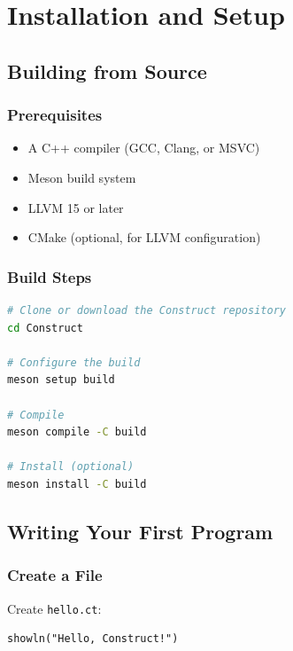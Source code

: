 \documentclass[11pt,twoside,openright]{book}
\begin{document}
\appendix

\chapter{Installation and Setup}

\section{Building from Source}

\subsection{Prerequisites}

\begin{itemize}
    \item A C++ compiler (GCC, Clang, or MSVC)
    \item Meson build system
    \item LLVM 15 or later
    \item CMake (optional, for LLVM configuration)
\end{itemize}

\subsection{Build Steps}

\begin{lstlisting}[language=bash]
# Clone or download the Construct repository
cd Construct

# Configure the build
meson setup build

# Compile
meson compile -C build

# Install (optional)
meson install -C build
\end{lstlisting}

\section{Writing Your First Program}

\subsection{Create a File}

Create \texttt{hello.ct}:

\begin{lstlisting}[language=ConstructLang]
showln("Hello, Construct!")
\end{lstlisting}
\end{document}
